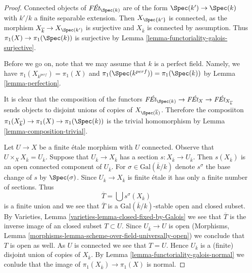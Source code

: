 \begin{proof}
Connected objects of $\textit{F\'Et}_{\Spec(k)}$ are of the form
$\Spec(k') \to \Spec(k)$ with $k'/k$ a finite separable extension.
Then $X_{\Spec{k'}}$ is connected, as the morphism
$X_{\overline{k}} \to X_{\Spec(k')}$ is surjective and
$X_{\overline{k}}$ is connected by assumption. Thus
$\pi_1(X) \to \pi_1(\Spec(k))$ is surjective by
Lemma \ref{lemma-functoriality-galois-surjective}.

\medskip\noindent
Before we go on, note that we may assume that $k$ is a perfect field.
Namely, we have $\pi_1(X_{k^{perf}}) = \pi_1(X)$ and
$\pi_1(\Spec(k^{perf})) = \pi_1(\Spec(k))$ by Lemma \ref{lemma-perfection}.

\medskip\noindent
It is clear that the composition of the functors
$\textit{F\'Et}_{\Spec(k)} \to \textit{F\'Et}_X \to
\textit{F\'Et}_{X_{\overline{k}}}$ sends objects to disjoint unions
of copies of $X_{\Spec(\overline{k})}$. Therefore the composiiton
$\pi_1(X_{\overline{k}}) \to \pi_1(X) \to \pi_1(\Spec(k))$
is the trivial homomorphism by Lemma \ref{lemma-composition-trivial}.

\medskip\noindent
Let $U \to X$ be a finite \'etale morphism with $U$ connected.
Observe that $U \times_X X_{\overline{k}} = U_{\overline{k}}$.
Suppose that $U_{\overline{k}} \to X_{\overline{k}}$
has a section $s : X_{\overline{k}} \to U_{\overline{k}}$.
Then $s(X_{\overline{k}})$ is an open connected component of
$U_{\overline{k}}$. For $\sigma \in \text{Gal}(\overline{k}/k)$
denote $s^\sigma$ the base change of $s$ by $\Spec(\sigma)$.
Since $U_{\overline{k}} \to X_{\overline{k}}$ is finite \'etale
it has only a finite number of sections. Thus
$$
\overline{T} = \bigcup s^\sigma(X_{\overline{k}})
$$
is a finite union and we see that $\overline{T}$ is a
$\text{Gal}(\overline{k}/k)$-stable open and closed subset.
By Varieties, Lemma \ref{varieties-lemma-closed-fixed-by-Galois}
we see that $\overline{T}$ is the inverse image of an closed
subset $T \subset U$. Since $U_{\overline{k}} \to U$ is open
(Morphisms, Lemma \ref{morphisms-lemma-scheme-over-field-universally-open})
we conclude that $T$ is open as well. As $U$ is connected we
see that $T = U$. Hence $U_{\overline{k}}$ is a (finite) disjoint
union of copies of $X_{\overline{k}}$. By
Lemma \ref{lemma-functoriality-galois-normal} we conlude that the image of
$\pi_1(X_{\overline{k}}) \to \pi_1(X)$ is normal.


\end{proof}
